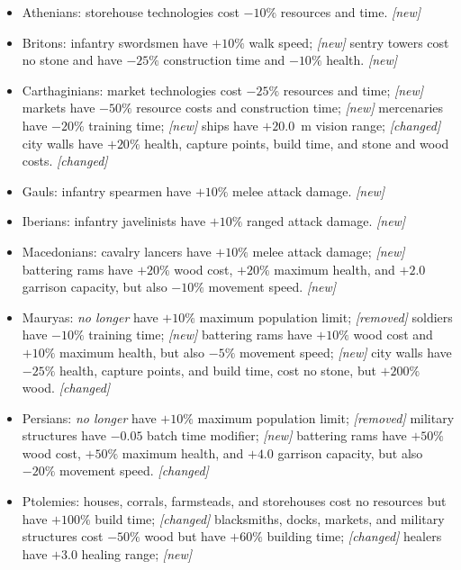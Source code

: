 \documentclass{article}
\begin{document}
\begin{itemize}
  \item Athenians:
  \subitem storehouse technologies cost $-10\%$ resources and time. \emph{[new]}
  \item Britons:
  \subitem infantry swordsmen have $+10\%$ walk speed; \emph{[new]}
  \subitem sentry towers cost no stone and have $-25\%$ construction time and $-10\%$ health. \emph{[new]}
  \item Carthaginians:
  \subitem market technologies cost $-25\%$ resources and time; \emph{[new]}
  \subitem markets have $-50\%$ resource costs and construction time; \emph{[new]}
  \subitem mercenaries have $-20\%$ training time; \emph{[new]}
  \subitem ships have $+20.0$~m vision range; \emph{[changed]}
  \subitem city walls have $+20\%$ health, capture points, build time, and stone and wood costs. \emph{[changed]}
  \item Gauls:
  \subitem infantry spearmen have $+10\%$ melee attack damage. \emph{[new]}
  \item Iberians:
  \subitem infantry javelinists have $+10\%$ ranged attack damage. \emph{[new]}
  \item Macedonians:
  \subitem cavalry lancers have $+10\%$ melee attack damage; \emph{[new]}
  \subitem battering rams have $+20\%$ wood cost, $+20\%$ maximum health, and $+2.0$ garrison capacity, but also $-10\%$ movement speed. \emph{[new]}
  \item Mauryas:
  \subitem \emph{no longer} have $+10\%$ maximum population limit; \emph{[removed]}
  \subitem soldiers have $-10\%$ training time; \emph{[new]}
  \subitem battering rams have $+10\%$ wood cost and $+10\%$ maximum health, but also $-5\%$ movement speed; \emph{[new]}
  \subitem city walls have $-25\%$ health, capture points, and build time, cost no stone, but $+200\%$ wood. \emph{[changed]}
  \item Persians:
  \subitem \emph{no longer} have $+10\%$ maximum population limit; \emph{[removed]}
  \subitem military structures have $-0.05$ batch time modifier; \emph{[new]} %
  \subitem battering rams have $+50\%$ wood cost, $+50\%$ maximum health, and $+4.0$ garrison capacity, but also $-20\%$ movement speed. \emph{[changed]}
  \item Ptolemies:
  \subitem houses, corrals, farmsteads, and storehouses cost no resources but have $+100\%$ build time; \emph{[changed]}
  \subitem blacksmiths, docks, markets, and military structures cost $-50\%$ wood but have $+60\%$ building time; \emph{[changed]}
  \subitem healers have $+3.0$ healing range; \emph{[new]}

\end{itemize}
\end{document}
